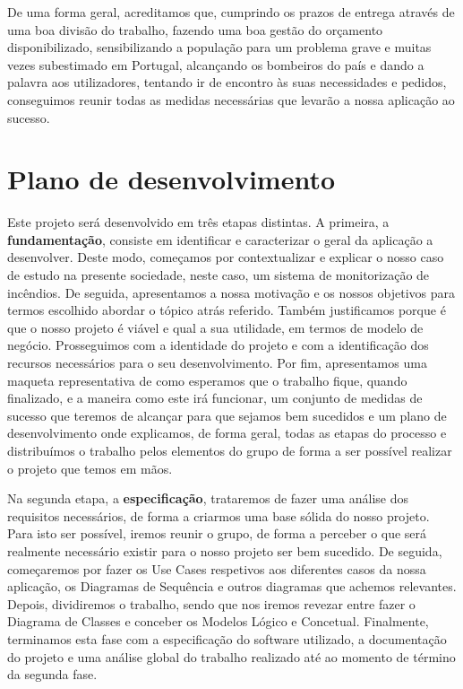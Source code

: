 \documentclass[a4paper,12pt]{scrreprt}
\newcommand{\tab}{
    \hspace{1cm}}
\begin{document}
        \tab De uma forma geral, acreditamos que, cumprindo os prazos de entrega através de uma boa divisão do trabalho, fazendo uma boa gestão do orçamento disponibilizado, sensibilizando a população para um problema grave e muitas vezes subestimado em Portugal, alcançando os bombeiros do país e dando a palavra aos utilizadores, tentando ir de encontro às suas necessidades e pedidos, conseguimos reunir todas as medidas necessárias que levarão a nossa aplicação ao sucesso.

    \section{Plano de desenvolvimento}
        \tab Este projeto será desenvolvido em três etapas distintas. A primeira, a \textbf{fundamentação}, consiste em identificar e caracterizar o geral da aplicação a desenvolver. Deste modo, começamos por contextualizar e explicar o nosso caso de estudo na presente sociedade, neste caso, um sistema de monitorização de incêndios. De seguida, apresentamos a nossa motivação e os nossos objetivos para termos escolhido abordar o tópico atrás referido. Também justificamos porque é que o nosso projeto é viável e qual a sua utilidade, em termos de modelo de negócio. Prosseguimos com a identidade do projeto e com a identificação dos recursos necessários para o seu desenvolvimento. Por fim, apresentamos uma maqueta representativa de como esperamos que o trabalho fique, quando finalizado, e a maneira como este irá funcionar, um conjunto de medidas de sucesso que teremos de alcançar para que sejamos bem sucedidos e um plano de desenvolvimento onde explicamos, de forma geral, todas as etapas do processo e distribuímos o trabalho pelos elementos do grupo de forma a ser possível realizar o projeto que temos em mãos.
        
        \tab Na segunda etapa, a \textbf{especificação}, trataremos de fazer uma análise dos requisitos necessários, de forma a criarmos uma base sólida do nosso projeto. Para isto ser possível, iremos reunir o grupo, de forma a perceber o que será realmente necessário existir para o nosso projeto ser bem sucedido. De seguida, começaremos por fazer os Use Cases respetivos aos diferentes casos da nossa aplicação, os Diagramas de Sequência e outros diagramas que achemos relevantes. Depois, dividiremos o trabalho, sendo que nos iremos revezar entre fazer o Diagrama de Classes e conceber os Modelos Lógico e Concetual. Finalmente, terminamos esta fase com a especificação do software utilizado, a documentação do projeto e uma análise global do trabalho realizado até ao momento de término da segunda fase.
        
\end{document}
